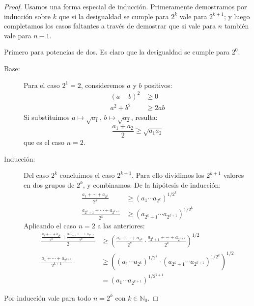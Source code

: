   \begin{proof}
    Usamos una forma especial de inducción.
    Primeramente demostramos por inducción sobre \(k\)
    que si la desigualdad se cumple para \(2^k\)
    vale para \(2^{k + 1}\);
    y luego completamos los casos faltantes
    a través de demostrar que si vale para \(n\)
    también vale para \(n - 1\).

    Primero para potencias de dos.
    Es claro que la desigualdad se cumple para \(2^0\).
    \begin{description}
    \item[Base:]
      Para el caso \(2^1 = 2\),
      consideremos \(a\) y \(b\) positivos:
      \begin{align*}
	(a - b)^2
	  &\ge 0 \\
	a^2 + b^2
	  &\ge 2 a b
      \end{align*}
      Si substituimos \(a \mapsto \sqrt{a_1}\),
      \(b \mapsto \sqrt{a_2}\),
      resulta:
      \begin{equation*}
	\frac{a_1 + a_2}{2}
	  \ge \sqrt{a_1 a_2}
      \end{equation*}
      que es el caso \(n = 2\).
    \item[Inducción:]
      Del caso \(2^k\) concluimos el caso \(2^{k + 1}\).
      Para ello dividimos los \(2^{k + 1}\) valores
      en dos grupos de \(2^k\),
      y combinamos.
      De la hipótesis de inducción:
      \begin{align*}
	\frac{a_1 + \dotsb + a_{2^k}}{2^k}
	  &\ge (a_1 \dotsm a_{2^k})^{1 / 2^k} \\
	\frac{a_{2^k + 1} + \dotsb + a_{2^{k + 1}}}{2^k}
	  &\ge (a_{2^k + 1} \dotsm a_{2^{k + 1}})^{1 / 2^k}
      \end{align*}
      Aplicando el caso \(n = 2\) a las anteriores:
      \begin{align*}
	\frac{\frac{a_1 + \dotsb + a_{2^k}}{2^k}
		+ \frac{a_{2^k + 1} + \dotsb + a_{2^{k + 1}}}{2^k}}
	     {2}
	  &\ge \left(
		 \frac{a_1 + \dotsb + a_{2^k}}{2^k}
		   \cdot \frac{a_{2^k + 1} + \dotsb + a_{2^{k + 1}}}
			      {2^k}
	       \right)^{1 / 2} \\
	\frac{a_1 + \dotsb + a_{2^{k + 1}}}{2^{k + 1}}
	  &\ge \left(
		 \left(
		   a_1 \dotsm a_{2^k}
		 \right)^{1 / {2^k}}
		   \cdot \left(
			   a_{2^k + 1} \dotsm a_{2^{k + 1}}
			 \right)^{1 / {2^k}}
	       \right)^{1 / 2} \\
	  &=   \left(
		   a_1 \dotsm a_{2^{k + 1}}
	       \right)^{1 / 2^{k + 1}}
      \end{align*}
    \end{description}
    Por inducción
    vale para todo \(n = 2^k\) con \(k \in \mathbb{N}_0\).


\end{proof}
